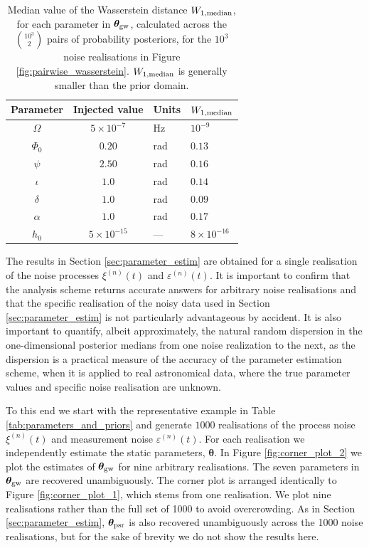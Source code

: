 \documentclass[fleqn,usenatbib,useAMS]{mnras}
\begin{document}
\begin{table}
	\centering
	\begin{tabular}{ccll}
		\toprule
		Parameter & Injected value & Units & $W_{1, \rm median}$  \\
		\hline
		$\Omega$     &   $5 \times 10^{-7}$ & Hz & $10^{-9}$ \\
		$\Phi_0$          & $0.20$ & rad & $0.13$ \\
		$\psi$              & $2.50$ & rad & $0.16$ \\
		$\iota$             & $1.0$ & rad & $0.14$ \\ 
		$\delta$              & $1.0$  & rad & $0.09$ \\
		$\alpha$          & $1.0$  & rad & $0.17$\\
		$h_0$            & $5 \times 10^{-15}$ & --- & $8 \times 10^{-16}$ \\
		\bottomrule
	\end{tabular}
	\caption{Median value of the Wasserstein distance $W_{1, \rm median}$, for each parameter in $\boldsymbol{\theta}_{\rm gw}$, calculated across the $10^3 \choose 2$ pairs of probability posteriors, for the $10^3$ noise realisations in Figure \ref{fig:pairwise_wasserstein}. $W_{1, \rm median}$ is generally smaller than the prior domain.}
	\label{tab:Wasserstein}
\end{table}

The results in Section \ref{sec:parameter_estim} are obtained for a single realisation of the noise processes $\xi^{(n)}(t)$ and $\varepsilon^{(n)}(t)$. It is important to confirm that the analysis scheme returns accurate answers for arbitrary noise realisations and that the specific realisation of the noisy data used in Section \ref{sec:parameter_estim} is not particularly advantageous by accident. It is also important to quantify, albeit approximately, the natural random dispersion in the one-dimensional posterior medians from one noise realization to the next, as the dispersion is a practical measure of the accuracy of the parameter estimation scheme, when it is applied to real astronomical data, where the true parameter values and specific noise realisation are unknown. \newline 

To this end we start with the representative example in Table \ref{tab:parameters_and_priors} and generate $1000$ realisations of the process noise $\xi^{(n)}(t)$ and measurement noise $\varepsilon^{(n)}(t)$. For each realisation we independently estimate the static parameters, $\boldsymbol{\theta}$. In Figure \ref{fig:corner_plot_2} we plot the estimates of $\boldsymbol{\theta}_{\rm gw}$ for nine arbitrary realisations. The seven parameters in ${\boldsymbol{\theta}}_{\rm gw}$ are recovered unambiguously. The corner plot is arranged identically to Figure \ref{fig:corner_plot_1}, which stems from one realisation. We plot nine realisations rather than the full set of 1000 to avoid overcrowding. As in Section \ref{sec:parameter_estim}, $\boldsymbol{\theta}_{\rm psr}$ is also recovered unambiguously across the 1000 noise realisations, but for the sake of brevity we do not show the results here. \newline 
\end{document}
